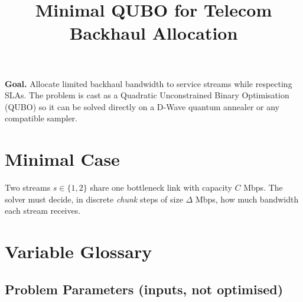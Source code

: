 \documentclass[11pt,a4paper]{article}
\title{Minimal QUBO for Telecom Backhaul Allocation}
\author{}
\date{}
\begin{document}
\maketitle

\textbf{Goal.} Allocate limited backhaul bandwidth to service streams while respecting SLAs.
The problem is cast as a Quadratic Unconstrained Binary Optimisation (QUBO) so it can be
solved directly on a D-Wave quantum annealer or any compatible sampler.

\section*{Minimal Case}

Two streams $s\in\{1,2\}$ share one bottleneck link with capacity $C$ Mbps.
The solver must decide, in discrete \emph{chunk} steps of size $\Delta$ Mbps, how much
bandwidth each stream receives.

\section*{Variable Glossary}

\subsection*{Problem Parameters (inputs, not optimised)}
\end{document}
